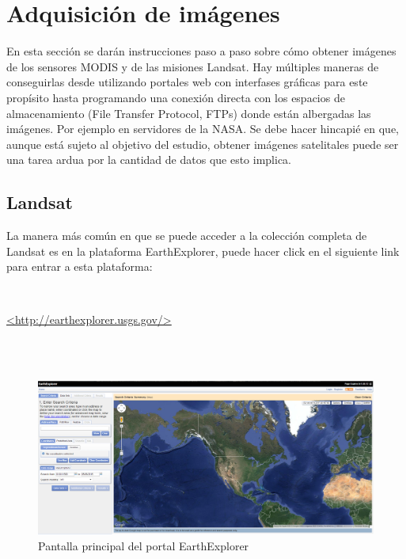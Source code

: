 \section{Adquisición de imágenes}

En esta sección se darán instrucciones paso a paso sobre cómo obtener imágenes de los sensores MODIS y de las misiones Landsat. Hay múltiples maneras de conseguirlas desde utilizando portales web con interfases gráficas para este propísito hasta programando una conexión directa con los espacios de almacenamiento (File Transfer Protocol, FTPs) donde están albergadas las imágenes. Por ejemplo en servidores de la NASA. Se debe hacer hincapié en que, aunque está sujeto al objetivo del estudio, obtener imágenes satelitales puede ser una tarea ardua por la cantidad de datos que esto implica. 

\subsection{Landsat}

La manera más común en que se puede acceder a la colección completa de Landsat es en la plataforma EarthExplorer, puede hacer click en el siguiente link para entrar a esta plataforma: 

\\
\begin{center}
\url{<http://earthexplorer.usgs.gov/>}
\end{center}
\\

\\

\begin{figure}[h!]
\begin{center}
\leavevmode
\includegraphics[width=6in]{5_earthexplorer.png}
\end{center}
\caption{Pantalla principal del portal EarthExplorer}
\end{figure}

